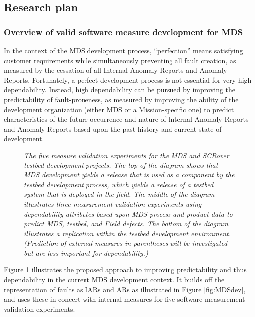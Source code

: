 \subsection{Research plan}
\label{sec:project-plan}

\subsubsection{Overview of valid software measure development for MDS}

In the context of the MDS development process, ``perfection'' means
satisfying customer requirements while simultaneously preventing all fault
creation, as measured by the cessation of all Internal Anomaly Reports and
Anomaly Reports.  Fortunately, a perfect development process is not
essential for very high dependability.  Instead, high dependability can be
pursued by improving the predictability of fault-proneness, as measured by
improving the ability of the development organization (either MDS or a
Mission-specific one) to predict characteristics of the future occurrence
and nature of Internal Anomaly Reports and Anomaly Reports based upon the
past history and current state of development.

\begin{figure}[t]
 {\centerline {}}
 \caption{{\small \em The five measure validation experiments
 for the MDS and SCRover testbed development projects.  The top of the diagram shows
 that MDS development yields a release that is used as a component by the
 testbed development process, which yields a release of a testbed system
 that is deployed in the field.  The middle of the diagram
 illustrates three measurement validation experiments using dependability
 attributes based upon MDS process and 
 product data to predict MDS, testbed, and Field defects. The bottom 
 of the diagram illustrates a replication within the testbed development environment.
 (Prediction of external measures in parentheses 
 will be investigated but are less important for dependability.)}}
 \label{fig:Measures}
\end{figure}

Figure \ref{fig:Measures} illustrates the proposed approach to improving
predictability and thus dependability in the current MDS development
context. It builds off the representation of faults as IARs and ARs as
illustrated in Figure \ref{fig:MDSdev}, and uses these in concert with
internal measures for five software measurement validation experiments.



